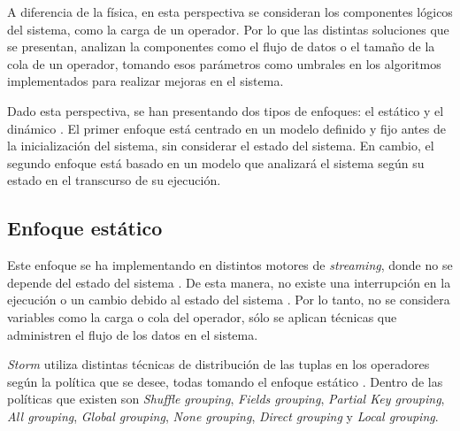 A diferencia de la física, en esta perspectiva se consideran los componentes lógicos del sistema, como la carga de un operador. Por lo que las distintas soluciones que se presentan, analizan la componentes como el flujo de datos o el tamaño de la cola de un operador, tomando esos parámetros como umbrales en los algoritmos implementados para realizar mejoras en el sistema.


Dado esta perspectiva, se han presentando dos tipos de enfoques: el estático y el dinámico \citep{Gupta99loadsharing}. El primer enfoque está centrado en un modelo definido y fijo antes de la inicialización del sistema, sin considerar el estado del sistema. En cambio, el segundo enfoque está basado en un modelo que analizará el sistema según su estado en el transcurso de su ejecución.


\subsection{Enfoque estático}

Este enfoque se ha implementando en distintos motores de \textsl{streaming}, donde no se depende del estado del sistema \citep{stormtwitter, s4}. De esta manera, no existe una interrupción en la ejecución o un cambio debido al estado del sistema \citep{CasavantK88}. Por lo tanto, no se considera variables como la carga o cola del operador, sólo se aplican técnicas que administren el flujo de los datos en el sistema.


\textsl{Storm} utiliza distintas técnicas de distribución de las tuplas en los operadores según la política que se desee, todas tomando el enfoque estático \citep{stormtwitter}. Dentro de las políticas que existen son \textit{Shuffle grouping}, \textit{Fields grouping}, \textit{Partial Key grouping}, \textit{All grouping}, \textit{Global grouping}, \textit{None grouping}, \textit{Direct grouping} y \textit{Local grouping}.

